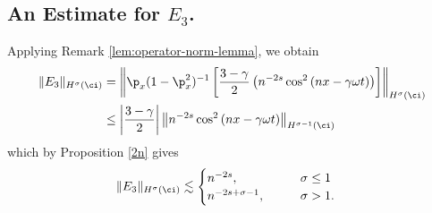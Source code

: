 \subsection{An Estimate for $\hyperref[90]{E_3}$.}
Applying Remark \ref{lem:operator-norm-lemma}, we obtain
		\begin{equation}
		\begin{split}
			\|E_3\|_{H^\sigma(\ci)} & = \left \|\p_x(1-\p_x^2)^{-1}
			\left[ \frac{3-\gamma}{2}\left( n^{-2s}\cos^2\left( nx - \gamma 
			\omega
			t\right)\right) \right] \right \|_{H^\sigma(\ci)}
			\\
			& \le \left |\frac{3-\gamma}{2}\right |
			\left \| n^{-2s}\cos^2\left( nx - \gamma \omega t \right)
			\right \|_{H^{\sigma -1 }(\ci)}
			\end{split}
	\end{equation}
which by Proposition \ref{2n} gives
		\begin{equation}
			\label{yuoo}
		\begin{split}
			\|E_3\|_{H^\sigma(\ci)}
			& \lesssim 
			\begin{cases}
				n^{-2s}, \qquad & \sigma \le 1  \\
				n^{-2s +\sigma -1}, \qquad & \sigma
				> 1.
			\end{cases}
		\end{split}
	\end{equation}
